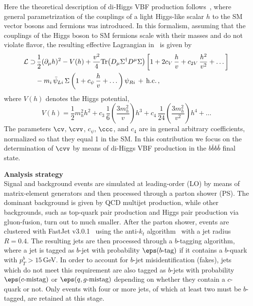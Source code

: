 Here the theoretical description of di-Higgs VBF production follows~\cite{Contino:2010mh}, where general parametrization of the
couplings of a light Higgs-like scalar $h$ to the SM vector bosons and fermions
was introduced.
%
In this formalism, assuming that the couplings of the Higgs boson to SM fermions scale with their masses and
do not violate flavor, the resulting effective Lagrangian in~\cite{Contino:2010mh}
is given by
\begin{equation}
\label{eq:lagrangian}
\begin{split}
{\cal L}  \supset
 & \, \frac{1}{2}(\partial_\mu h)^2 - V(h) +\frac{v^2}{4}{\rm Tr}\!\left (D_\mu \Sigma^\dagger D^\mu \Sigma\right )
    \left [ 1+2c_V\, \frac{h}{v}+c_{2V}\,\frac{h^2}{v^2}+\dots\right ] \\
 &-m_i\,\bar \psi_{Li}\, \Sigma\left (1+c_{\psi}\,\frac{h}{v} + \dots \right)\psi_{Ri}\,+\,{\rm h.c.}\, ,
\end{split}
\end{equation}
%
where $V(h)$ denotes the Higgs potential, 
%
\begin{equation}
\label{eq:potential}
V(h) = \frac{1}{2} m_h^2 h^2 + c_3\, \frac{1}{6} \left( \frac{3m_h^2}{v} \right) h^3 + c_4\, \frac{1}{24} \left( \frac{3m_h^2}{v^2} \right) h^4 + \dots
\end{equation}
%
The parameters $\cv$, $\cvv$, $c_{\psi}$, $\ccc$, and $c_4$ are in general
arbitrary coefficients, normalized so that they equal 1 in the SM.
%
In this contribution we focus on the determination of $\cvv$ by means
of di-Higgs VBF production in the $b\bar{b}b\bar{b}$ final state.

\noindent
{\bf Analysis strategy}\\
Signal and background events are simulated at leading-order (LO) by means of
matrix-element  generators and then processed through a parton shower (PS).
%
The dominant background is given by QCD multijet production,
while other backgrounds, such as top-quark pair production and 
Higgs pair production via
gluon-fusion, turn out to much smaller.
%
After the parton shower, events are clustered with 
{\sc\small FastJet} v3.0.1~\cite{Cacciari:2011ma} using the
anti-$k_t$ algorithm~\cite{Cacciari:2008gp} with a jet radius $R=0.4$.
%
The resulting jets are then processed through a $b$-tagging algorithm,
where a jet is tagged as $b$-jet with probability $\eps(b\text{-tag})$ 
if it contains a $b$-quark with $p_T^b > 15\,$GeV.
%
In order to account for $b$-jet misidentification (fakes),
jets which do not meet this requirement
are also tagged as $b$-jets with probability $\eps(c\text{-mistag})$ or $\eps(q,g\text{-mistag})$
depending on whether they contain a $c$-quark or not.
%
Only events with four or more jets, of which at least two
must be $b$-tagged, are retained at this stage.

